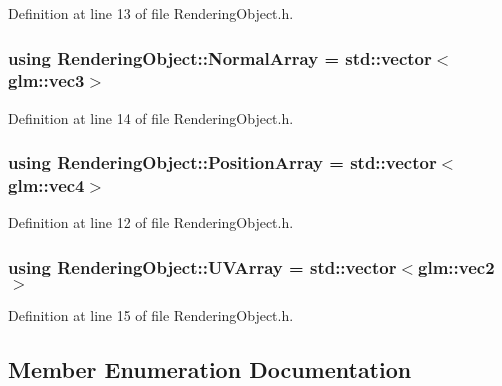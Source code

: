 Definition at line 13 of file Rendering\+Object.\+h.

\hypertarget{class_rendering_object_a327c4d892de8d6138fb59afa6d078257}{}
\subsubsection[{Normal\+Array}]{\setlength{\rightskip}{0pt plus 5cm}using {\bf Rendering\+Object\+::\+Normal\+Array} =  std\+::vector$<$glm\+::vec3$>$}\label{class_rendering_object_a327c4d892de8d6138fb59afa6d078257}


Definition at line 14 of file Rendering\+Object.\+h.

\hypertarget{class_rendering_object_a1223b9cf03f2029b9c43d71042c2a18e}{}
\subsubsection[{Position\+Array}]{\setlength{\rightskip}{0pt plus 5cm}using {\bf Rendering\+Object\+::\+Position\+Array} =  std\+::vector$<$glm\+::vec4$>$}\label{class_rendering_object_a1223b9cf03f2029b9c43d71042c2a18e}


Definition at line 12 of file Rendering\+Object.\+h.

\hypertarget{class_rendering_object_a504ecd45ebe36dfa5b78c46d64d9904a}{}
\subsubsection[{U\+V\+Array}]{\setlength{\rightskip}{0pt plus 5cm}using {\bf Rendering\+Object\+::\+U\+V\+Array} =  std\+::vector$<$glm\+::vec2$>$}\label{class_rendering_object_a504ecd45ebe36dfa5b78c46d64d9904a}


Definition at line 15 of file Rendering\+Object.\+h.



\subsection{Member Enumeration Documentation}
\hypertarget{class_rendering_object_ab772f569ef63a1db07db29a744b519ee}{}

